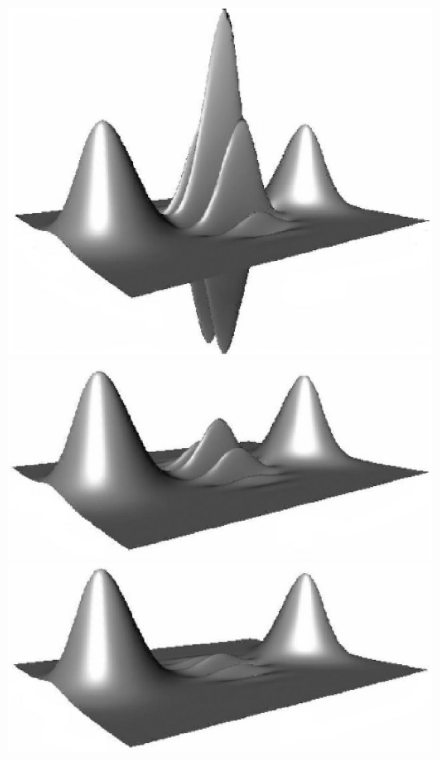 \documentclass[twocolumn,aps,floatfix,amsmath,amssymb,showpacs,nofootinbib]{revtex4}
\begin{document}
\begin{figure}
\begin{center}
 \includegraphics[scale=.2]{squid-dec1-n.eps}

 \includegraphics[scale=.2]{squid-dec2-n.eps}

 \includegraphics[scale=.2]{squid-dec3-n.eps}


\end{center}
\end{figure}
\end{document}
